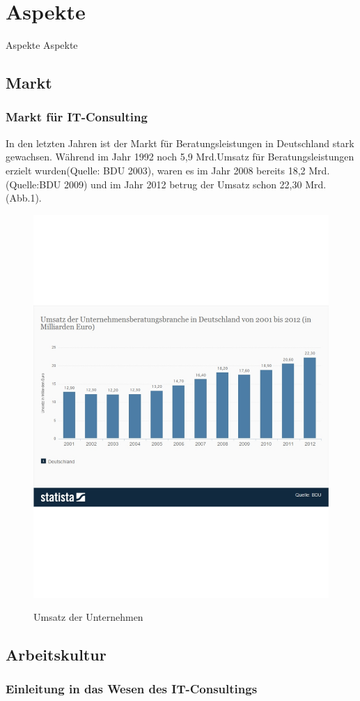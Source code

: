 \chapter{Aspekte}
Aspekte Aspekte
\section{Markt}
	\subsection{Markt für IT-Consulting}
	In den letzten Jahren ist der Markt für Beratungsleistungen in Deutschland stark gewachsen. Während im Jahr 1992 noch 5,9 Mrd.\texteuro Umsatz für Beratungsleistungen erzielt wurden(Quelle: BDU 2003), waren es im Jahr 2008 bereits 18,2 Mrd. \texteuro (Quelle:BDU 2009) und im Jahr 2012 betrug der Umsatz schon 22,30 Mrd. \texteuro (Abb.1).
	\begin{figure}[htp]
	\centering
	\includegraphics[width=0.5\linewidth]{./UmsatzUBeratungsbrancheDeutschland}
	\label{fig:UmsatzUBeratungsbrancheDeutschland}
	\caption{Umsatz der Unternehmen}
	\end{figure}
\section{Arbeitskultur}
	\subsection{Einleitung in das Wesen des IT-Consultings}
	
